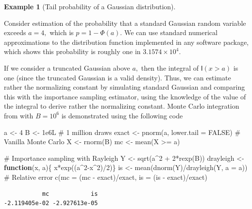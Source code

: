 \documentclass[
  11pt,
  letterpaper,
]{scrbook}
\newenvironment{Shaded}{\begin{snugshade}}{\end{snugshade}}
\newcommand{\AttributeTok}[1]{\textcolor[rgb]{0.40,0.45,0.13}{#1}}
\newcommand{\CommentTok}[1]{\textcolor[rgb]{0.37,0.37,0.37}{#1}}
\newcommand{\ConstantTok}[1]{\textcolor[rgb]{0.56,0.35,0.01}{#1}}
\newcommand{\ControlFlowTok}[1]{\textcolor[rgb]{0.00,0.23,0.31}{\textbf{#1}}}
\newcommand{\DecValTok}[1]{\textcolor[rgb]{0.68,0.00,0.00}{#1}}
\newcommand{\FloatTok}[1]{\textcolor[rgb]{0.68,0.00,0.00}{#1}}
\newcommand{\FunctionTok}[1]{\textcolor[rgb]{0.28,0.35,0.67}{#1}}
\newcommand{\NormalTok}[1]{\textcolor[rgb]{0.00,0.23,0.31}{#1}}
\newcommand{\OtherTok}[1]{\textcolor[rgb]{0.00,0.23,0.31}{#1}}
\newcommand{\SpecialCharTok}[1]{\textcolor[rgb]{0.37,0.37,0.37}{#1}}
\theoremstyle{definition}
\theoremstyle{definition}
\newtheorem{example}{Example}[chapter]
\theoremstyle{definition}
\theoremstyle{plain}
\theoremstyle{plain}
\theoremstyle{plain}
\theoremstyle{remark}
\begin{document}
\begin{example}[Tail probability of a Gaussian
distribution]\protect\hypertarget{exm-tail-probability}{}\label{exm-tail-probability}

Consider estimation of the probability that a standard Gaussian random
variable exceeds \(a=4,\) which is \(p=1-\Phi(a).\) We can use standard
numerical approximations to the distribution function implemented in any
software package, which shows this probability is roughly one in
\(\ensuremath{3.1574\times 10^{4}}.\)

If we consider a truncated Gaussian above \(a,\) then the integral of
\(\mathsf{I}(x>a)\) is one (since the truncated Gaussian is a valid
density). Thus, we can estimate rather the normalizing constant by
simulating standard Gaussian and comparing this with the importance
sampling estimator, using the knowledge of the value of the integral to
derive rather the normalizing constant. Monte Carlo integration from
with \(B=10^6\) is demonstrated using the following code

\begin{Shaded}
\begin{Highlighting}[]
\NormalTok{a }\OtherTok{\textless{}{-}} \DecValTok{4}
\NormalTok{B }\OtherTok{\textless{}{-}} \FloatTok{1e6}\NormalTok{L }\CommentTok{\# 1 million draws}
\NormalTok{exact }\OtherTok{\textless{}{-}} \FunctionTok{pnorm}\NormalTok{(a, }\AttributeTok{lower.tail =} \ConstantTok{FALSE}\NormalTok{)}
\CommentTok{\# Vanilla Monte Carlo}
\NormalTok{X }\OtherTok{\textless{}{-}} \FunctionTok{rnorm}\NormalTok{(B)}
\NormalTok{mc }\OtherTok{\textless{}{-}} \FunctionTok{mean}\NormalTok{(X }\SpecialCharTok{\textgreater{}=}\NormalTok{ a)}

\CommentTok{\# Importance sampling with Rayleigh}
\NormalTok{Y }\OtherTok{\textless{}{-}} \FunctionTok{sqrt}\NormalTok{(a}\SpecialCharTok{\^{}}\DecValTok{2} \SpecialCharTok{+} \DecValTok{2}\SpecialCharTok{*}\FunctionTok{rexp}\NormalTok{(B))}
\NormalTok{drayleigh }\OtherTok{\textless{}{-}} \ControlFlowTok{function}\NormalTok{(x, a)\{ x}\SpecialCharTok{*}\FunctionTok{exp}\NormalTok{((a}\SpecialCharTok{\^{}}\DecValTok{2}\SpecialCharTok{{-}}\NormalTok{x}\SpecialCharTok{\^{}}\DecValTok{2}\NormalTok{)}\SpecialCharTok{/}\DecValTok{2}\NormalTok{)\}}
\NormalTok{is }\OtherTok{\textless{}{-}} \FunctionTok{mean}\NormalTok{(}\FunctionTok{dnorm}\NormalTok{(Y)}\SpecialCharTok{/}\FunctionTok{drayleigh}\NormalTok{(Y, }\AttributeTok{a =}\NormalTok{ a))}
\CommentTok{\# Relative error}
\FunctionTok{c}\NormalTok{(}\AttributeTok{mc =}\NormalTok{ (mc }\SpecialCharTok{{-}}\NormalTok{ exact)}\SpecialCharTok{/}\NormalTok{exact, }\AttributeTok{is =}\NormalTok{ (is }\SpecialCharTok{{-}}\NormalTok{ exact)}\SpecialCharTok{/}\NormalTok{exact)}
\end{Highlighting}
\end{Shaded}

\begin{verbatim}
           mc            is 
-2.119405e-02 -2.927613e-05 
\end{verbatim}

\end{example}
\end{document}
